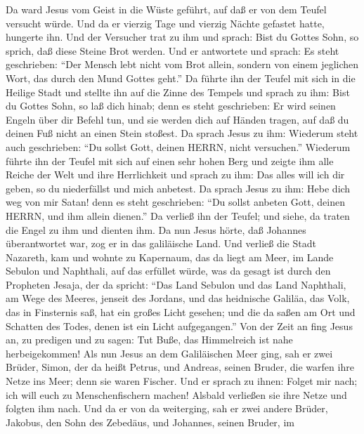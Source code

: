  Da ward Jesus vom Geist in die Wüste geführt, auf daß er
von dem Teufel versucht würde.  Und da er vierzig Tage und
vierzig Nächte gefastet hatte, hungerte ihn.  Und der
Versucher trat zu ihm und sprach: Bist du Gottes Sohn, so sprich, daß
diese Steine Brot werden.  Und er antwortete und sprach: Es
steht geschrieben: ``Der Mensch lebt nicht vom Brot allein, sondern von
einem jeglichen Wort, das durch den Mund Gottes geht.''  Da
führte ihn der Teufel mit sich in die Heilige Stadt und stellte ihn auf
die Zinne des Tempels  und sprach zu ihm: Bist du Gottes
Sohn, so laß dich hinab; denn es steht geschrieben: Er wird seinen
Engeln über dir Befehl tun, und sie werden dich auf Händen tragen, auf
daß du deinen Fuß nicht an einen Stein stoßest.  Da sprach
Jesus zu ihm: Wiederum steht auch geschrieben: ``Du sollst Gott, deinen
HERRN, nicht versuchen.''  Wiederum führte ihn der Teufel
mit sich auf einen sehr hohen Berg und zeigte ihm alle Reiche der Welt
und ihre Herrlichkeit  und sprach zu ihm: Das alles will ich
dir geben, so du niederfällst und mich anbetest.  Da sprach
Jesus zu ihm: Hebe dich weg von mir Satan! denn es steht geschrieben:
``Du sollst anbeten Gott, deinen HERRN, und ihm allein dienen.''
 Da verließ ihn der Teufel; und siehe, da traten die Engel
zu ihm und dienten ihm.  Da nun Jesus hörte, daß Johannes
überantwortet war, zog er in das galiläische Land.  Und
verließ die Stadt Nazareth, kam und wohnte zu Kapernaum, das da liegt am
Meer, im Lande Sebulon und Naphthali,  auf das erfüllet
würde, was da gesagt ist durch den Propheten Jesaja, der da spricht:
 ``Das Land Sebulon und das Land Naphthali, am Wege des
Meeres, jenseit des Jordans, und das heidnische Galiläa, 
das Volk, das in Finsternis saß, hat ein großes Licht gesehen; und die
da saßen am Ort und Schatten des Todes, denen ist ein Licht
aufgegangen.''  Von der Zeit an fing Jesus an, zu predigen
und zu sagen: Tut Buße, das Himmelreich ist nahe herbeigekommen!
 Als nun Jesus an dem Galiläischen Meer ging, sah er zwei
Brüder, Simon, der da heißt Petrus, und Andreas, seinen Bruder, die
warfen ihre Netze ins Meer; denn sie waren Fischer.  Und er
sprach zu ihnen: Folget mir nach; ich will euch zu Menschenfischern
machen!  Alsbald verließen sie ihre Netze und folgten ihm
nach.  Und da er von da weiterging, sah er zwei andere
Brüder, Jakobus, den Sohn des Zebedäus, und Johannes, seinen Bruder, im
